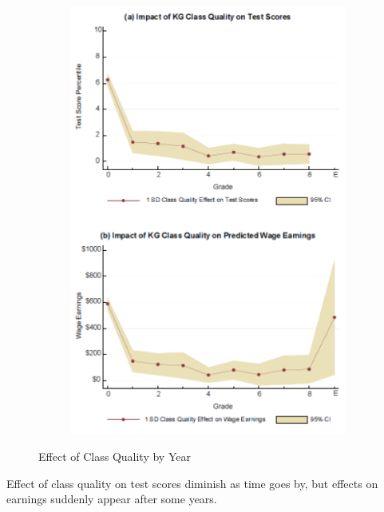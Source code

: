 \begin{figure}[H]
\begin{subfigure}[b]{0.4\textwidth}
                     \includegraphics[width=\textwidth]{images/ch9/9 chetty 2011 5.png}
                 \end{subfigure}
                 \caption{Effect of Class Quality by Year}
            \end{figure}
            Effect of class quality on test scores diminish as time goes by, but effects on earnings suddenly appear after some years.

        \subsubsection{\cite{chetty_measuring_2014}}

